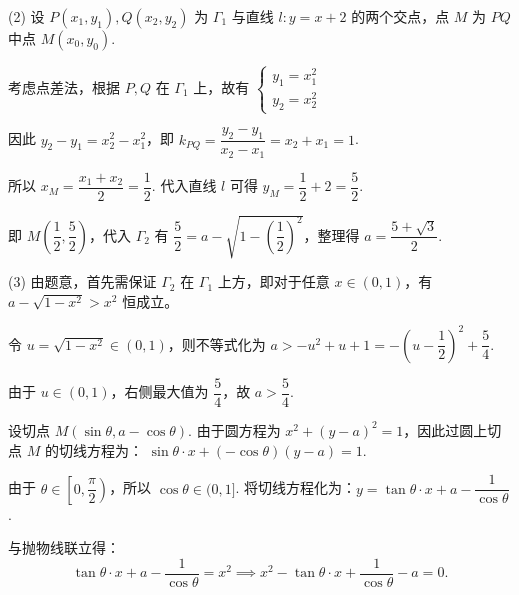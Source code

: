 \begin{solutions}

(2) 设 $P(x_1, y_1), Q(x_2, y_2)$ 为 $\Gamma_1$ 与直线 $l:y=x+2$ 的两个交点，点 $M$ 为 $PQ$ 中点 $M(x_0, y_0)$.

考虑点差法，根据 $P,Q$ 在 $\Gamma_1$ 上，故有 $\begin{cases} y_1 = x_1^2 \\ y_2 = x_2^2 \end{cases}$

因此 $ y_2 - y_1 = x_2^2 - x_1^2 $，即 $ k_{PQ}=\dfrac{y_2 - y_1}{x_2 - x_1} = x_2 + x_1=1$.

所以 $x_M = \dfrac{x_1 + x_2}{2} = \dfrac{1}{2}$. 代入直线 $l$ 可得 $y_M=\dfrac{1}{2}+2=\dfrac{5}{2}$.

即 $M\left(\dfrac{1}{2}, \dfrac{5}{2}\right)$，代入 $\Gamma_2$ 有 $\dfrac{5}{2} = a - \sqrt{1 - \left(\dfrac{1}{2}\right)^2}$，整理得 $a = \dfrac{5+\sqrt{3}}{2}$.

(3) 由题意，首先需保证 $\Gamma_2$ 在 $\Gamma_1$ 上方，即对于任意 $x \in (0,1)$，有 $a - \sqrt{1-x^2} > x^2$ 恒成立。

令 $u = \sqrt{1-x^2} \in (0,1)$，则不等式化为 $a > -u^2 + u + 1 = -\left(u - \dfrac{1}{2}\right)^2 + \dfrac{5}{4}$.

由于 $u \in (0,1)$，右侧最大值为 $\dfrac{5}{4}$，故 $a > \dfrac{5}{4}$. 


设切点 $M(\sin\theta, a-\cos\theta)$. 由于圆方程为 $x^2 + (y-a)^2 = 1$，因此过圆上切点 $M$ 的切线方程为：
$\sin\theta \cdot x + (-\cos\theta)(y-a) = 1$.

由于 $\theta \in \left[0, \dfrac{\pi}{2}\right)$，所以 $\cos\theta \in (0, 1]$. 将切线方程化为：$y = \tan\theta \cdot x + a - \dfrac{1}{\cos\theta}$.

与抛物线联立得：
$$
\tan\theta \cdot x + a - \dfrac{1}{\cos\theta} = x^2 \implies x^2 - \tan\theta \cdot x + \dfrac{1}{\cos\theta} - a = 0.
$$


\end{solutions}
